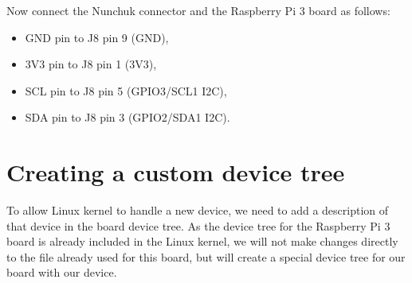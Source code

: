 \documentclass[11pt]{article}
\begin{document}
Now connect the Nunchuk connector and the Raspberry Pi 3 board as follows:
\begin{itemize}
	\item GND pin to J8 pin 9 (GND),
	\item 3V3 pin to J8 pin 1 (3V3),
	\item SCL pin to J8 pin 5 (GPIO3/SCL1 I2C),
	\item SDA pin to J8 pin 3 (GPIO2/SDA1 I2C).
\end{itemize}

\section{Creating a custom device tree}
To allow Linux kernel to handle a new device, we need to add a description of
that device in the board device tree. As the device tree for the Raspberry Pi 3
board is already included in the Linux kernel, we will not make changes directly
to the file already used for this board, but will create a special device tree
for our board with our device.
\end{document}
